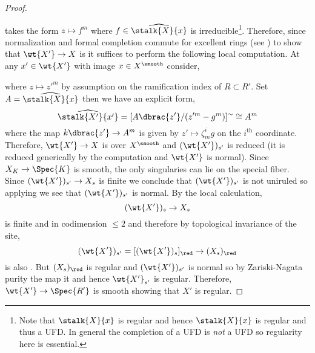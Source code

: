 \documentclass[12pt]{article}
\begin{document}
\begin{proof}
\begin{center}
\end{center}
takes the form $z \mapsto f^m$ where $f \in \widehat{\stalk{X}{x}}$ is irreducible\footnote{Note that $\stalk{X}{x}$ is regular and hence $\stalk{X}{x}$ is regular and thus a UFD. In general the completion of a UFD is \textit{not} a UFD so regularity here is essential.}. Therefore, since normalization and formal completion commute for excellent rings (see ) to show that $\wt{X'} \to X$ is \etale it suffices to perform the following local computation. At any $x' \in \wt{X'}$ with image $x \in X^{\smooth}$ consider,
\begin{center}
\end{center}
where $z \mapsto z'^m$ by assumption on the ramification index of $R \subset R'$. Set $A = \widehat{\stalk{X}{x}}$ then we have an explicit form,
\[ \widehat{\stalk{X'}{x'}} = [A \dbrac{z'}/(z'^{m} - g^m)]^{\sim} \cong A^m \]
where the map $k\dbrac{z'} \to A^m$ is given by $z' \mapsto \zeta_m^i g$ on the $i^{\text{th}}$ coordinate. Therefore, $\wt{X'} \to X$ is \etale over $X^{\smooth}$ and $(\wt{X'})_{s'}$ is reduced (it is reduced generically by the computation and $\wt{X'}$ is normal). Since $X_K \to \Spec{K}$ is smooth, the only singularies can lie on the special fiber. Since $(\wt{X'})_{s'} \to X_s$ is finite we conclude that $(\wt{X'})_{s'}$ is not uniruled so applying \cite[Thm. 1.1]{takayama_degeneration} we see that $(\wt{X'})_{s'}$ is normal. By the local calculation,
\[ (\wt{X'})_{s} \to X_s \]
is finite and \etale in codimension $\le 2$ and therefore by topological invariance of the \etale site,
\[ (\wt{X'})_{s'} = [(\wt{X'})_{s}]_{\red} \to (X_s)_{\red} \]
is also \etale. But $(X_s)_{\red}$ is regular and $(\wt{X'})_{s'}$ is normal so by Zariski-Nagata purity the map it \etale and hence $\wt{X'}_{s'}$ is regular. Therefore, $\wt{X'} \to \Spec{R'}$ is smooth showing that $X'$ is regular.
\end{proof}
\end{document}
